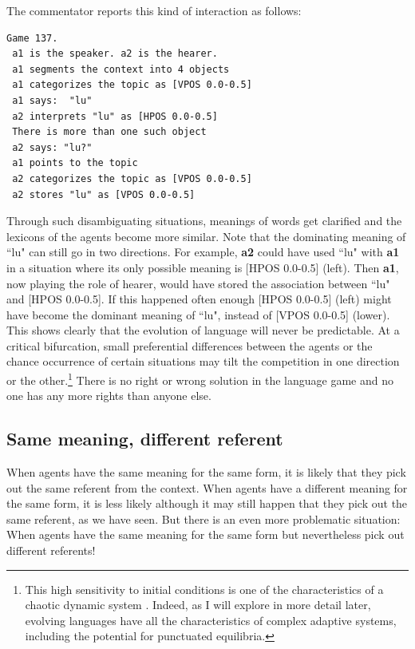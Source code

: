 The commentator reports this kind of interaction as follows: 
\begin{verbatim}
Game 137.
 a1 is the speaker. a2 is the hearer. 
 a1 segments the context into 4 objects
 a1 categorizes the topic as [VPOS 0.0-0.5]
 a1 says:  "lu"
 a2 interprets "lu" as [HPOS 0.0-0.5]
 There is more than one such object
 a2 says: "lu?"
 a1 points to the topic
 a2 categorizes the topic as [VPOS 0.0-0.5]
 a2 stores "lu" as [VPOS 0.0-0.5]
\end{verbatim}

Through such disambiguating situations, meanings of words
get clarified and the lexicons of the agents
become more similar. Note that the 
dominating meaning of ``lu" can still go in 
two directions. For example, {\bf a2}
could have used ``lu" with {\bf a1} 
in a situation where its only possible meaning 
is [HPOS 0.0-0.5] (left). Then {\bf a1}, now playing the role
of hearer, would have stored the association between
``lu" and [HPOS 0.0-0.5]. If this happened often 
enough [HPOS 0.0-0.5] (left) might
have become the dominant meaning of ``lu", instead of 
[VPOS 0.0-0.5] (lower). This shows clearly that the 
evolution of language will never be predictable. At a critical 
bifurcation, small preferential differences between 
the agents or the chance occurrence of certain situations
may tilt the competition in one direction or the other.\footnote{
This high sensitivity to initial conditions is 
one of the characteristics of a chaotic dynamic
system \cite{Lorenz:1993}.
Indeed, as I will explore in more detail later, 
evolving languages have all the characteristics
of complex adaptive systems, including the 
potential for punctuated equilibria.}
There is no right
or wrong solution in the language game and no one has
any more rights than anyone else. 

\subsection{Same meaning, different referent} 

When agents have the same meaning for the same
form, it is likely that they
pick out the same referent from the context. When agents
have a different meaning for the same form, it is less 
likely although it may still happen that they pick 
out the same referent, as we have seen. But there 
is an even more problematic situation: When agents have the 
same meaning for the same form but nevertheless pick out 
different referents! 

